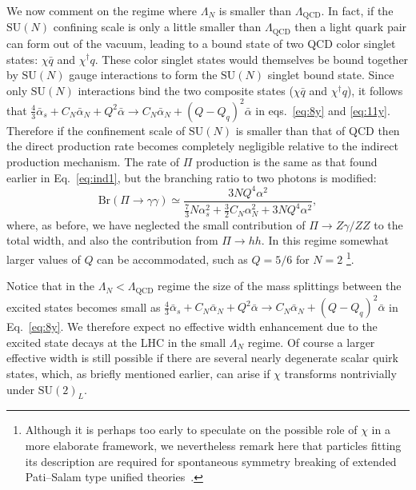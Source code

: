 We now comment on the regime where $\Lambda_{N}$ is smaller than
$\Lambda_{\text{QCD}}$. In fact, if the $\mathrm{SU}(N)$ confining scale is only a
little smaller than $\Lambda_{\text{QCD}}$ then a light quark pair can form out of the
vacuum, leading to a bound state of two QCD color singlet states: $\chi \bar{q}$
and $\chi^\dagger q$. These color singlet states would themselves be bound
together by $\mathrm{SU}(N)$ gauge interactions to form the $\mathrm{SU}(N)$
singlet bound state. Since only $\mathrm{SU}(N)$ interactions bind the two
composite states ($\chi \bar{q}$ and $\chi^\dagger q$), it follows that
$\frac{4}{3} \bar \alpha_s + C_{N} \bar{\alpha}_{N} + Q^2 \bar{\alpha} \to C_{N} \bar{\alpha}_{N} + (Q - Q_q)^2 \bar{\alpha}$
in eqs.~\ref{eq:8y} and \ref{eq:11y}. Therefore if the confinement scale of
$\mathrm{SU}(N)$ is smaller than that of QCD then the direct production rate
becomes completely negligible relative to the indirect production mechanism. The
rate of $\Pi$ production is the same as that found earlier in Eq.~\ref{eq:ind1},
but the branching ratio to two photons is modified:
\begin{equation}
  \text{Br}(\Pi \rightarrow \gamma \gamma) \simeq \frac{3NQ^4 \alpha^2}{\frac{7}{3}N\alpha_{s}^2
    + \frac{3}{2} C_{N} \alpha_{N}^2 + 3NQ^4\alpha^2},
\end{equation}
where, as before, we have neglected the small contribution of $\Pi \rightarrow
Z\gamma / ZZ$ to the total width, and also the contribution from $\Pi \rightarrow hh$.
In this regime somewhat larger values of $Q$ can be accommodated, such as $Q = 5/6$ for $N=2$ \footnote{
  Although it is perhaps too early to speculate on the possible role of $\chi$ in a more elaborate framework,
  we nevertheless remark here that particles fitting its description are required for spontaneous symmetry breaking of
  extended Pati--Salam type unified theories~\cite{Foot:1990ij}.}.


Notice that in the $\Lambda_{N} < \Lambda_{\text{QCD}}$ regime the
size of the mass splittings between the excited states becomes small as
$\frac{4}{3} \bar \alpha_s + C_{N} \bar{\alpha}_{N} + Q^2 \bar{\alpha} \to
C_{N} \bar{\alpha}_{N} + (Q - Q_q)^2 \bar{\alpha} $ in Eq.~\ref{eq:8y}. We therefore
expect no effective width enhancement due to the excited state decays at the LHC
in the small $\Lambda_{N}$ regime. Of course a larger effective width is still possible if there are
several nearly degenerate scalar quirk states, which, as briefly mentioned earlier,
can arise if $\chi$ transforms nontrivially under $\mathrm{SU}(2)_{L}$.


